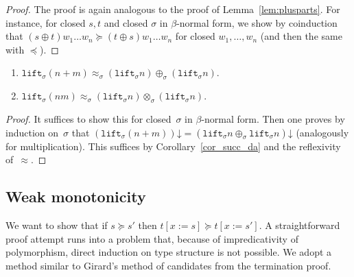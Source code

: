 \documentclass[runningheads,a4paper]{llncs}
\newcommand{\subst}[2]{#1:=#2}
\newcommand{\lift}{\mathtt{lift}}
\newcommand{\da}{\mathord{\downarrow}}
\begin{document}
\begin{proof}
  The proof is again analogous to the proof of
  Lemma~\ref{lem:plusparts}. For instance, for closed $s,t$ and closed
  $\sigma$ in $\beta$-normal form, we show by coinduction that $(s
  \oplus t) w_1 \ldots w_n \succeq (t \oplus s) w_1 \ldots w_n$ for
  closed $w_1,\ldots,w_n$ (and then the same with $\preceq$).
\end{proof}

\begin{lemma}
  \begin{enumerate}
  \item $\lift_\sigma(n+m) \approx_\sigma (\lift_\sigma n)
    \oplus_\sigma (\lift_\sigma n)$.
  \item $\lift_\sigma(n m) \approx_\sigma (\lift_\sigma n)
    \otimes_\sigma (\lift_\sigma n)$.
  \end{enumerate}
\end{lemma}

\begin{proof}
  It suffices to show this for closed~$\sigma$ in $\beta$-normal
  form. Then one proves by induction on~$\sigma$ that
  $(\lift_\sigma(n+m))\da = (\lift_\sigma n \oplus_\sigma \lift_\sigma
  n)\da$ (analogously for multiplication). This suffices by
  Corollary~\ref{cor_succ_da} and the reflexivity of~$\approx$.
\end{proof}

\subsection{Weak monotonicity}\label{sec_weakly_monotone}

We want to show that if $s \succeq s'$ then $t[\subst{x}{s}] \succeq
t[\subst{x}{s'}]$. A straightforward proof attempt runs into a problem
that, because of impredicativity of polymorphism, direct induction on
type structure is not possible. We adopt a method similar to Girard's
method of candidates from the termination proof.
\end{document}
